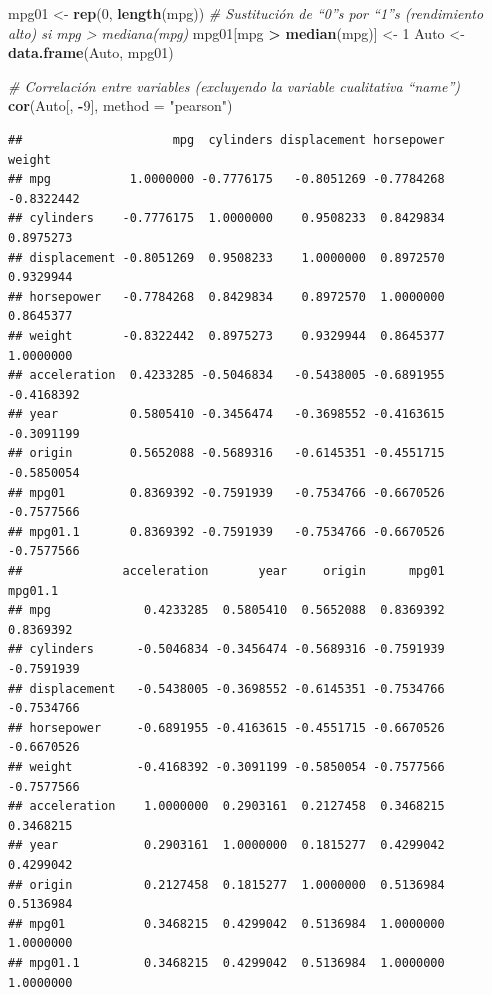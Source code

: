 \documentclass[]{book}
\newenvironment{Shaded}{\begin{snugshade}}{\end{snugshade}}
\newcommand{\KeywordTok}[1]{\textcolor[rgb]{0.13,0.29,0.53}{\textbf{#1}}}
\newcommand{\DataTypeTok}[1]{\textcolor[rgb]{0.13,0.29,0.53}{#1}}
\newcommand{\DecValTok}[1]{\textcolor[rgb]{0.00,0.00,0.81}{#1}}
\newcommand{\StringTok}[1]{\textcolor[rgb]{0.31,0.60,0.02}{#1}}
\newcommand{\CommentTok}[1]{\textcolor[rgb]{0.56,0.35,0.01}{\textit{#1}}}
\newcommand{\OperatorTok}[1]{\textcolor[rgb]{0.81,0.36,0.00}{\textbf{#1}}}
\newcommand{\NormalTok}[1]{#1}
\begin{document}
\begin{Shaded}
\begin{Highlighting}[]
\NormalTok{mpg01 <-}\StringTok{ }\KeywordTok{rep}\NormalTok{(}\DecValTok{0}\NormalTok{, }\KeywordTok{length}\NormalTok{(mpg))}
\CommentTok{# Sustitución de “0”s por “1”s (rendimiento alto) si mpg > mediana(mpg) }
\NormalTok{mpg01[mpg }\OperatorTok{>}\StringTok{ }\KeywordTok{median}\NormalTok{(mpg)] <-}\StringTok{ }\DecValTok{1}
\NormalTok{Auto <-}\StringTok{ }\KeywordTok{data.frame}\NormalTok{(Auto, mpg01)}
\end{Highlighting}
\end{Shaded}

\begin{Shaded}
\begin{Highlighting}[]
\CommentTok{# Correlación entre variables (excluyendo la variable cualitativa “name”)}
\KeywordTok{cor}\NormalTok{(Auto[, }\OperatorTok{-}\DecValTok{9}\NormalTok{], }\DataTypeTok{method =} \StringTok{"pearson"}\NormalTok{)}
\end{Highlighting}
\end{Shaded}

\begin{verbatim}
##                     mpg  cylinders displacement horsepower     weight
## mpg           1.0000000 -0.7776175   -0.8051269 -0.7784268 -0.8322442
## cylinders    -0.7776175  1.0000000    0.9508233  0.8429834  0.8975273
## displacement -0.8051269  0.9508233    1.0000000  0.8972570  0.9329944
## horsepower   -0.7784268  0.8429834    0.8972570  1.0000000  0.8645377
## weight       -0.8322442  0.8975273    0.9329944  0.8645377  1.0000000
## acceleration  0.4233285 -0.5046834   -0.5438005 -0.6891955 -0.4168392
## year          0.5805410 -0.3456474   -0.3698552 -0.4163615 -0.3091199
## origin        0.5652088 -0.5689316   -0.6145351 -0.4551715 -0.5850054
## mpg01         0.8369392 -0.7591939   -0.7534766 -0.6670526 -0.7577566
## mpg01.1       0.8369392 -0.7591939   -0.7534766 -0.6670526 -0.7577566
##              acceleration       year     origin      mpg01    mpg01.1
## mpg             0.4233285  0.5805410  0.5652088  0.8369392  0.8369392
## cylinders      -0.5046834 -0.3456474 -0.5689316 -0.7591939 -0.7591939
## displacement   -0.5438005 -0.3698552 -0.6145351 -0.7534766 -0.7534766
## horsepower     -0.6891955 -0.4163615 -0.4551715 -0.6670526 -0.6670526
## weight         -0.4168392 -0.3091199 -0.5850054 -0.7577566 -0.7577566
## acceleration    1.0000000  0.2903161  0.2127458  0.3468215  0.3468215
## year            0.2903161  1.0000000  0.1815277  0.4299042  0.4299042
## origin          0.2127458  0.1815277  1.0000000  0.5136984  0.5136984
## mpg01           0.3468215  0.4299042  0.5136984  1.0000000  1.0000000
## mpg01.1         0.3468215  0.4299042  0.5136984  1.0000000  1.0000000
\end{verbatim}
\end{document}
